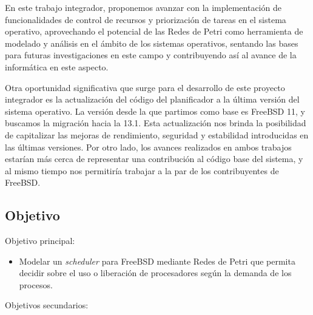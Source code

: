 En este trabajo integrador, proponemos avanzar con la implementación de funcionalidades de control de recursos y priorización de tareas en el sistema operativo, aprovechando el potencial de las Redes de Petri como herramienta de modelado y análisis en el ámbito de los sistemas operativos, sentando las bases para futuras investigaciones en este campo y contribuyendo así al avance de la informática en este aspecto.\par

Otra oportunidad significativa que surge para el desarrollo de este proyecto integrador es la actualización del código del planificador a la última versión del sistema operativo. La versión desde la que partimos como base es FreeBSD 11, y buscamos la migración hacia la 13.1. Esta actualización nos brinda la posibilidad de capitalizar las mejoras de rendimiento, seguridad y estabilidad introducidas en las últimas versiones. Por otro lado, los avances realizados en ambos trabajos estarían más cerca de representar una contribución al código base del sistema, y al mismo tiempo nos permitiría trabajar a la par de los contribuyentes de FreeBSD.\par

\subsection{Objetivo}

Objetivo principal:

\begin{itemize}
    \item Modelar un \textit{scheduler} para FreeBSD mediante Redes de Petri que permita decidir sobre el uso o liberación de procesadores según la demanda de los procesos.
\end{itemize}


Objetivos secundarios:


